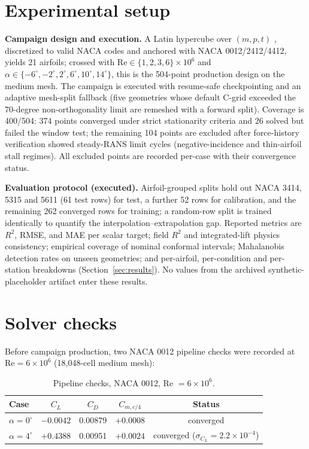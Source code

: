 \documentclass[11pt]{article}
\begin{document}
\section{Experimental setup}
\label{sec:setup}

\textbf{Campaign design and execution.} A Latin hypercube over $(m, p, t)$
\citep{mckay1979}, discretized to valid NACA codes and anchored with NACA
0012/2412/4412, yields 21 airfoils; crossed with
$\mathrm{Re}\in\{1,2,3,6\}\times10^6$ and
$\alpha\in\{-6^\circ,-2^\circ,2^\circ,6^\circ,10^\circ,14^\circ\}$, this is the
504-point production design on the medium mesh. The campaign is executed with
resume-safe checkpointing and an adaptive mesh-split fallback (five geometries
whose default C-grid exceeded the 70-degree non-orthogonality limit are
remeshed with a forward split). Coverage is 400/504: 374 points converged
under strict stationarity criteria and 26 solved but failed the window test;
the remaining 104 points are excluded after force-history verification showed
steady-RANS limit cycles (negative-incidence and thin-airfoil stall regimes).
All excluded points are recorded per-case with their convergence status.

\textbf{Evaluation protocol (executed).} Airfoil-grouped splits hold out
NACA 3414, 5315 and 5611 (61 test rows) for test, a further 52 rows for
calibration, and the remaining 262 converged rows for training; a random-row
split is trained identically to quantify the interpolation--extrapolation gap.
Reported metrics are $R^2$, RMSE, and MAE per scalar target; field $R^2$ and
integrated-lift physics consistency; empirical coverage of nominal conformal
intervals; Mahalanobis detection rates on unseen geometries; and
per-airfoil, per-condition and per-station breakdowns
(Section~\ref{sec:results}). No values from the archived synthetic-placeholder
artifact enter these results.

\section{Solver checks}
\label{sec:verification}

Before campaign production, two NACA 0012 pipeline checks were recorded at
$\mathrm{Re}=6\times10^6$ (18{,}048-cell medium mesh):

\begin{table}[h]
\centering
\caption{Pipeline checks, NACA 0012, Re $=6\times10^6$.}
\label{tab:verify}
\begin{tabular}{lcccc}
\toprule
Case & $C_L$ & $C_D$ & $C_{m,c/4}$ & Status \\
\midrule
$\alpha=0^\circ$ & $-0.0042$ & 0.00879 & $+0.0008$ & converged \\
$\alpha=4^\circ$ & $+0.4388$ & 0.00951 & $+0.0024$ & converged
($\sigma_{C_L}=2.2\times10^{-4}$) \\
\bottomrule
\end{tabular}
\end{table}
\end{document}
